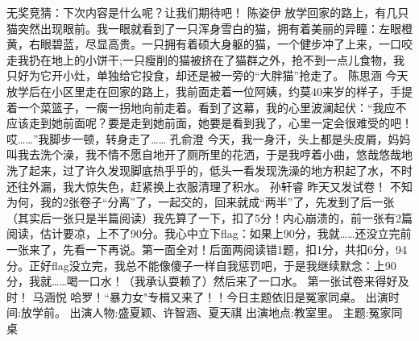 {}无奖竞猜：下次内容是什么呢？让我们期待吧！\markdownRendererInterblockSeparator
{}\markdownRendererInterblockSeparator
{}陈姿伊\markdownRendererInterblockSeparator
{}放学回家的路上，有几只猫突然出现眼前。我一眼就看到了一只浑身雪白的猫，拥有着美丽的异瞳：左眼橙黄，右眼碧蓝，尽显高贵。一只拥有着硕大身躯的猫，一个健步冲了上来，一口咬走我扔在地上的小饼干;一只瘦削的猫被挤在了猫群之外，抢不到一点儿食物，我只好为它开小灶，单独给它投食，却还是被一旁的“大胖猫”抢走了。 \markdownRendererInterblockSeparator
{}\markdownRendererInterblockSeparator
{}陈思涵\markdownRendererInterblockSeparator
{}今天放学后在小区里走在回家的路上，我前面走着一位阿姨，约莫40来岁的样子，手提着一个菜篮子，一瘸一拐地向前走着。看到了这幕，我的心里波澜起伏：“我应不应该走到她前面呢？要是走到她前面，她要是看到我了，心里一定会很难受的吧！哎……”我脚步一顿，转身走了……\markdownRendererInterblockSeparator
{}\markdownRendererInterblockSeparator
{}孔俞澄\markdownRendererInterblockSeparator
{}今天，我一身汗，头上都是头皮屑，妈妈叫我去洗个澡，我不情不愿自地开了厕所里的花洒，于是我哼着小曲，悠哉悠哉地洗了起来，过了许久发现脚底热乎乎的，低头一看发现洗澡的地方积起了水，不时还往外漏，我大惊失色，赶紧换上衣服清理了积水。\markdownRendererInterblockSeparator
{}\markdownRendererInterblockSeparator
{}孙轩睿\markdownRendererInterblockSeparator
{}昨天又发试卷！\markdownRendererInterblockSeparator
{}不知为何，我的2张卷子“分离”了，一起交的，回来就成“两半”了，先发到了后一张（其实后一张只是半篇阅读）我先算了一下，扣了5分！内心崩溃的，前一张有2篇阅读，估计要凉，上不了90分。我心中立下flag：如果上90分，我就……还没立完前一张来了，先看一下再说。第一面全对！后面两阅读错1题，扣1分，共扣6分，94分。正好flag没立完，我总不能像傻子一样自我惩罚吧，于是我继续默念：上90分，我就……喝一口水！（我承认耍赖了）然后来了一口水。\markdownRendererInterblockSeparator
{}第一张试卷来得好及时！\markdownRendererInterblockSeparator
{}\markdownRendererInterblockSeparator
{}马涵悦\markdownRendererInterblockSeparator
{}哈罗！“暴力女"专楫又来了！！今日主题依旧是冤家同桌。\markdownRendererInterblockSeparator
{}出演时间:放学前。 出演人物:盛夏颖、许智涵、夏天祺 \markdownRendererInterblockSeparator
{}出演地点:教室里。 主题:冤家同桌 \markdownRendererInterblockSeparator
